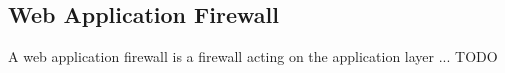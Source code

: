 \subsection{Web Application Firewall}
A web application firewall is a firewall acting on the application layer ... {\color{red} TODO}
